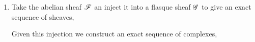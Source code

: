 \documentclass[12pt]{article}
\begin{document}
\begin{enumerate}
\item Take the abelian sheaf $\mathscr{F}$ an inject it into a flasque sheaf $\mathscr{G}$ to give an exact sequence of sheaves,
\begin{center}
\end{center}
Given this injection we construct an exact sequence of complexes,
\begin{center}
\end{center}

\renewcommand{\Q}{\mathscr{Q}}


\end{enumerate}
\end{document}
